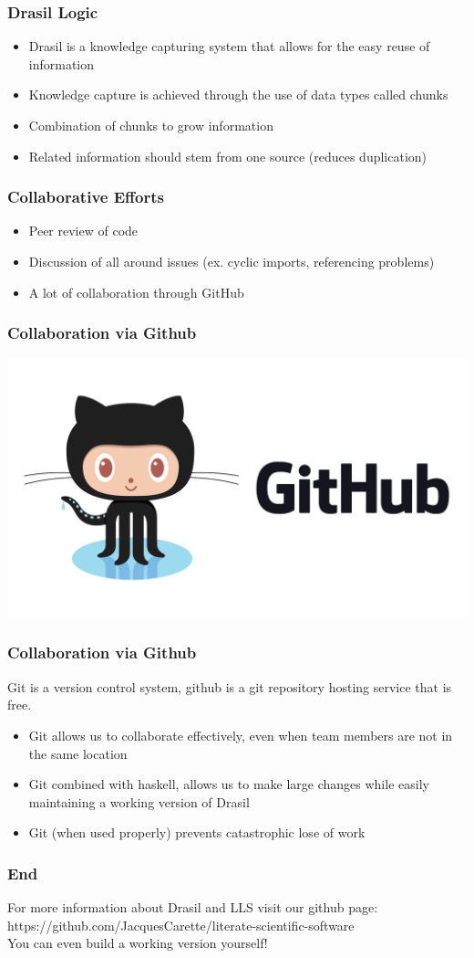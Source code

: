\documentclass{beamer}
\begin{document}
\begin{frame}
\frametitle{Drasil Logic}
\begin{itemize}
 \item<1-> Drasil is a knowledge capturing system that allows for the easy reuse of information
 \item<2-> Knowledge capture is achieved through the use of data types called chunks
 \item<3-> Combination of chunks to grow information
 \item<4-> Related information should stem from one source (reduces duplication)
\end{itemize}
\end{frame}

\begin{frame}
\frametitle{Collaborative Efforts}
\begin{itemize}
 \item<1-> Peer review of code
 \item<2-> Discussion of all around issues (ex. cyclic imports, referencing problems)
 \item<3-> A lot of collaboration through GitHub
\end{itemize}
\end{frame}

\begin{frame}
\frametitle{Collaboration via Github}
\includegraphics[scale=0.2]{./Github_Logo.png}
\end{frame}

\begin{frame}
\frametitle{Collaboration via Github}
Git is a version control system, github is a git repository hosting service that is \alert{free}.
\begin{itemize}
 \item<1-> Git allows us to collaborate effectively, even when team members are not in the same location
 \item<2-> Git combined with haskell, allows us to make large changes while easily maintaining a working version of Drasil
 \item<3-> Git \alert{(when used properly)} prevents catastrophic lose of work
\end{itemize}
\end{frame}

\begin{frame}
\frametitle{End}
For more information about Drasil and LLS visit our github page: \\
https://github.com/JacquesCarette/literate-scientific-software \\
\alert{You can even build a working version yourself!}
\end{frame}
\end{document}
